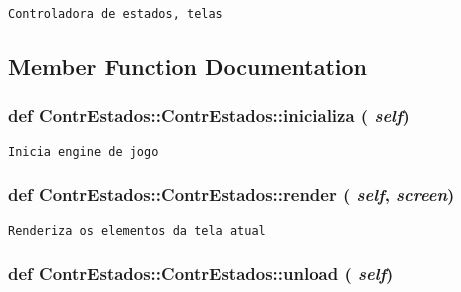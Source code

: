 \begin{footnotesize}\begin{verbatim}Controladora de estados, telas\end{verbatim}
\end{footnotesize}
 

\subsection{Member Function Documentation}
\hypertarget{class_contr_estados_1_1_contr_estados_e72809cd793410f555310ea810f0567e}{
\subsubsection[{inicializa}]{\setlength{\rightskip}{0pt plus 5cm}def ContrEstados::ContrEstados::inicializa ( {\em self})}}
\label{class_contr_estados_1_1_contr_estados_e72809cd793410f555310ea810f0567e}




\begin{footnotesize}\begin{verbatim}Inicia engine de jogo\end{verbatim}
\end{footnotesize}
 \hypertarget{class_contr_estados_1_1_contr_estados_bd0156c12ca63cbd72d15d810f0815bc}{
\subsubsection[{render}]{\setlength{\rightskip}{0pt plus 5cm}def ContrEstados::ContrEstados::render ( {\em self}, \/   {\em screen})}}
\label{class_contr_estados_1_1_contr_estados_bd0156c12ca63cbd72d15d810f0815bc}




\begin{footnotesize}\begin{verbatim}Renderiza os elementos da tela atual\end{verbatim}
\end{footnotesize}
 \hypertarget{class_contr_estados_1_1_contr_estados_667dcf2cf83d81231060e3e6345f047e}{
\subsubsection[{unload}]{\setlength{\rightskip}{0pt plus 5cm}def ContrEstados::ContrEstados::unload ( {\em self})}}
\label{class_contr_estados_1_1_contr_estados_667dcf2cf83d81231060e3e6345f047e}




